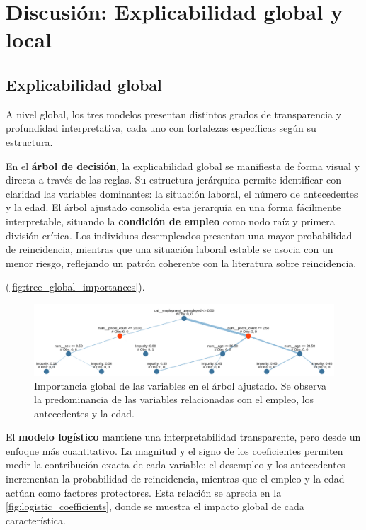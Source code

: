 \section{Discusión: Explicabilidad global y local}

\subsection{Explicabilidad global}

A nivel global, los tres modelos presentan distintos grados de transparencia y profundidad interpretativa, cada uno con fortalezas específicas según su estructura.

En el \textbf{árbol de decisión}, la explicabilidad global se manifiesta de forma visual y directa a través de las reglas. 
Su estructura jerárquica permite identificar con claridad las variables dominantes: la situación laboral, el número de antecedentes y la edad. 
El árbol ajustado consolida esta jerarquía en una forma fácilmente interpretable, situando la \textbf{condición de empleo} como nodo raíz y primera división crítica. 
Los individuos desempleados presentan una mayor probabilidad de reincidencia, mientras que una situación laboral estable se asocia con un menor riesgo, reflejando un patrón coherente con la literatura sobre reincidencia.

(\autoref{fig:tree_global_importances}).

\begin{figure}[h]
  \centering
  \includegraphics[width=0.85\linewidth]{figures/tree_global_importances.png}
  \caption{Importancia global de las variables en el árbol ajustado. 
  Se observa la predominancia de las variables relacionadas con el empleo, los antecedentes y la edad.}
  \label{fig:tree_global_importances}
\end{figure}

El \textbf{modelo logístico} mantiene una interpretabilidad transparente, pero desde un enfoque más cuantitativo. 
La magnitud y el signo de los coeficientes permiten medir la contribución exacta de cada variable: 
el desempleo y los antecedentes incrementan la probabilidad de reincidencia, mientras que el empleo y la edad actúan como factores protectores.
Esta relación se aprecia en la \autoref{fig:logistic_coefficients}, donde se muestra el impacto global de cada característica.

